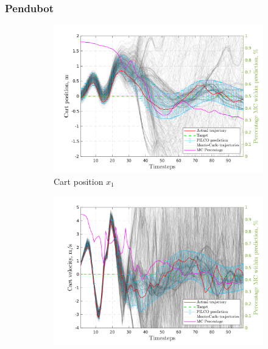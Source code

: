 \subsubsection{Pendubot}
 \begin{figure}[htp!]    
    \begin{subfigure}[b]{1\linewidth}
    \centering
    \includegraphics[height=0.4\textheight,width=1\textwidth]{Chapter3/Figures/cdp_MC_rollout_Ep_75_Dim_1.png} 
    \caption{Cart position $x_1$} 
    \label{Fig:Re-cdp-cart-position} 
  \end{subfigure} 
  \hspace{\fill}  %
  \begin{subfigure}[b]{1\linewidth}
    \centering
    \includegraphics[height=0.4\textheight,width=1\textwidth]{Chapter3/Figures/cdp_MC_rollout_Ep_75_Dim_2.png} 

\end{subfigure}
\end{figure}
